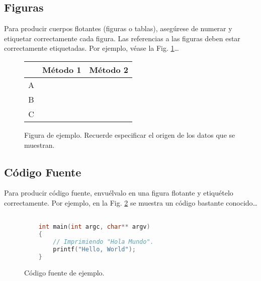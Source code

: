 \documentclass[a4paper]{article}
\begin{document}
	\subsection{Figuras}\label{sub:figures}
		Para producir cuerpos flotantes (figuras o tablas), asegúrese de numerar
		y etiquetar correctamente cada figura. Las referencias a las figuras deben
		estar correctamente etiquetadas. Por ejemplo, véase la Fig. \ref{fig:ex}\ldots

		\begin{figure}[h!]%
		\begin{center}
			\begin{tabular}{|c|c|c|} \hline
			 			& Método 1 	& Método 2 	\\ \hline
			A 			&  			&  			\\ \hline
			B			& 			& 			\\ \hline
			C 			& 			&  			\\ \hline
			\end{tabular}
		\caption{Figura de ejemplo. Recuerde especificar el origen de los datos que se muestran. \label{fig:ex}}
		\end{center}
		\end{figure}

	\subsection{Código Fuente}\label{sub:listings}
		Para producir código fuente, envuélvalo en una figura flotante y
		etiquételo correctamente. Por ejemplo, en la Fig. \ref{fig:code}
		se muestra un código bastante conocido\ldots


		\begin{figure}[htb]%
			\begin{lstlisting}[language=c]%

    int main(int argc, char** argv)
    {
        // Imprimiendo "Hola Mundo".
        printf("Hello, World");
    }

			\end{lstlisting}
		\caption{Código fuente de ejemplo.\label{fig:code}}
		\end{figure}
\end{document}
